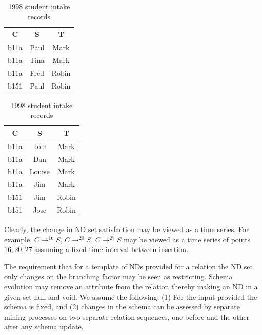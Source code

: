 {\line
\begin{table}[ht]
\begin{minipage}[b]{7.2cm}
\begin{center}
\begin{tabular}{|c|c|c|} \hline
 C & S & T \\ \hline
 b11a & Paul & Mark \\ 
 b11a & Tina & Mark \\
 b11a & Fred & Robin \\
 b151 & Paul & Robin \\ \hline
\end{tabular}
\end{center}
\caption{\label{tab:1} 1997 student intake records}
\end{minipage}
\hfill
\begin{minipage}[b]{7.2cm}
\begin{center}
\begin{tabular}{|c|c|c|} \hline
 C & S & T \\ \hline
 b11a & Tom & Mark \\
 b11a & Dan & Mark \\
 b11a & Louise & Mark \\
 b11a & Jim & Mark \\
 b151 & Jim & Robin \\ 
 b151 & Jose & Robin \\ \hline
\end{tabular}
\end{center}
\caption{\label{tab:2} 1998 student intake records}
\end{minipage}
\end{table}
}


Clearly, the change in ND set satisfaction may be viewed as a
time series. For example, $C \to^{16} S$, $C \to^{20} S$, $C \to^{27} S$ may
be viewed as a time series of points $16,20,27$ assuming a fixed time
interval between insertion.

\medskip

The requirement that for a template of NDs provided for a relation the
ND set only changes on the branching factor may be seen as
restricting. Schema evolution \cite{oe92,rod94} may remove an attribute from
the relation thereby making an ND in a given set null and void. We
assume the following: (1) For the input provided the schema is fixed,
and (2) changes in the schema can be assessed by separate mining
processes on two separate relation sequences, one before and the other after
any schema update.  


